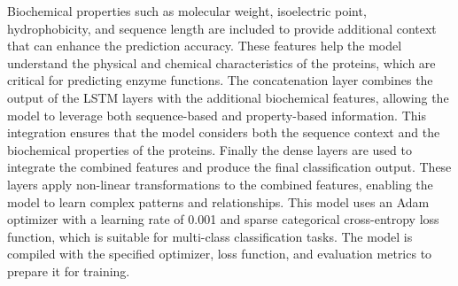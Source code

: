 Biochemical properties such as molecular weight, isoelectric point, hydrophobicity, and sequence length are included to provide additional context that can enhance the prediction accuracy. These features help the model understand the physical and chemical characteristics of the proteins, which are critical for predicting enzyme functions. The concatenation layer combines the output of the LSTM layers with the additional biochemical features, allowing the model to leverage both sequence-based and property-based information. This integration ensures that the model considers both the sequence context and the biochemical properties of the proteins. Finally the dense layers are used to integrate the combined features and produce the final classification output. These layers apply non-linear transformations to the combined features, enabling the model to learn complex patterns and relationships.
This model uses an Adam optimizer with a learning rate of 0.001 and sparse categorical cross-entropy loss function, which is suitable for multi-class classification tasks. The model is compiled with the specified optimizer, loss function, and evaluation metrics to prepare it for training.